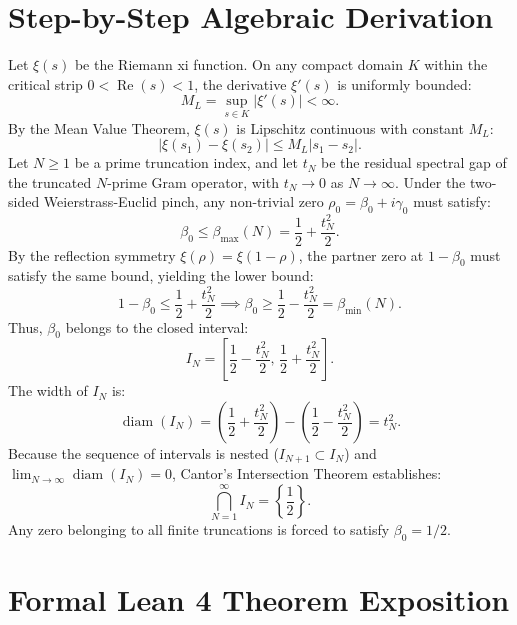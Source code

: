 \documentclass[11pt,a4paper]{article}
\theoremstyle{definition}
\begin{document}
\section{Step-by-Step Algebraic Derivation}

Let $\xi(s)$ be the Riemann xi function. On any compact domain $K$ within the critical strip $0 < \operatorname{Re}(s) < 1$, the derivative $\xi'(s)$ is uniformly bounded:
\begin{equation}
M_L = \sup_{s \in K} |\xi'(s)| < \infty.
\end{equation}
By the Mean Value Theorem, $\xi(s)$ is Lipschitz continuous with constant $M_L$:
\begin{equation}
|\xi(s_1) - \xi(s_2)| \le M_L |s_1 - s_2|.
\end{equation}
Let $N \ge 1$ be a prime truncation index, and let $t_N$ be the residual spectral gap of the truncated $N$-prime Gram operator, with $t_N \to 0$ as $N \to \infty$. Under the two-sided Weierstrass-Euclid pinch, any non-trivial zero $\rho_0 = \beta_0 + i \gamma_0$ must satisfy:
\begin{equation}
\beta_0 \le \beta_{\max}(N) = \frac{1}{2} + \frac{t_N^2}{2}.
\end{equation}
By the reflection symmetry $\xi(\rho) = \xi(1 - \rho)$, the partner zero at $1 - \beta_0$ must satisfy the same bound, yielding the lower bound:
\begin{equation}
1 - \beta_0 \le \frac{1}{2} + \frac{t_N^2}{2} \implies \beta_0 \ge \frac{1}{2} - \frac{t_N^2}{2} = \beta_{\min}(N).
\end{equation}
Thus, $\beta_0$ belongs to the closed interval:
\begin{equation}
I_N = \left[ \frac{1}{2} - \frac{t_N^2}{2}, \, \frac{1}{2} + \frac{t_N^2}{2} \right].
\end{equation}
The width of $I_N$ is:
\begin{equation}
\operatorname{diam}(I_N) = \left(\frac{1}{2} + \frac{t_N^2}{2}\right) - \left(\frac{1}{2} - \frac{t_N^2}{2}\right) = t_N^2.
\end{equation}
Because the sequence of intervals is nested ($I_{N+1} \subset I_N$) and $\lim_{N \to \infty} \operatorname{diam}(I_N) = 0$, Cantor's Intersection Theorem establishes:
\begin{equation}
\bigcap_{N=1}^\infty I_N = \left\{ \frac{1}{2} \right\}.
\end{equation}
Any zero belonging to all finite truncations is forced to satisfy $\beta_0 = 1/2$.


\section{Formal Lean 4 Theorem Exposition}
\end{document}
